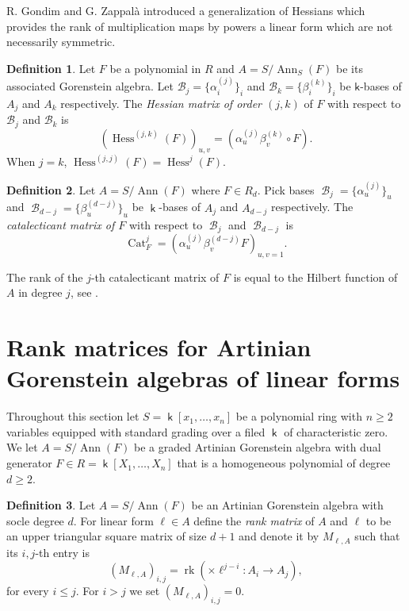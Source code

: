\documentclass[12pt]{amsart}
\numberwithin{equation}{section}
\theoremstyle{plain} \newtheorem{theorem}{Theorem}[section]
\theoremstyle{definition} \newtheorem{definition}[theorem]{Definition}
\DeclareMathOperator{\Hess}{Hess}\DeclareMathOperator{\rk}{rk}
\DeclareMathOperator{\ann}{Ann}\DeclareMathOperator{\Char}{char}
\DeclareMathOperator{\Cat}{Cat}\DeclareMathOperator{\B}{\mathcal{B}}
\DeclareMathOperator{\K}{\mathsf{k}}
\begin{document}
R. Gondim and G. Zappal\`a \cite{GZ} introduced a generalization of Hessians which provides the rank of multiplication maps by powers a linear form which are not necessarily symmetric.
\begin{definition}\cite[Definition 2.1]{GZ}
Let $F$ be a polynomial in $R$ and $A= S/\ann_S(F)$ be its associated Gorenstein algebra. Let $\mathcal{B}_{j} = \lbrace \alpha^{(j)}_i\rbrace_i$ and $\mathcal{B}_{k} = \lbrace \beta^{(k)}_i\rbrace_i$ be $\mathsf{k}$-bases of $A_j$ and $A_k$ respectively. The \emph{Hessian matrix of order $(j,k)$} of $F$ with respect to $\mathcal{B}_j$  and $\mathcal{B}_k$ is 
$$
(\Hess^{(j,k)}(F))_{u,v}=(\alpha^{(j)}_u\beta^{(k)}_v \circ F).
$$
When $j=k$, $\Hess^{(j,j)}(F)=\Hess^{j}(F)$. 
\end{definition}
\begin{definition}
 Let $A= S/\ann(F)$ where $F\in R_d$. Pick bases $\B_j = \lbrace \alpha^{(j)}_u\rbrace_u$ and $\B_{d-j} = \lbrace \beta^{(d-j)}_u\rbrace_u$ be $\K$-bases of $A_j$ and $A_{d-j}$ respectively. The \emph{catalecticant matrix of $F$} with respect to $\B_j$ and $\B_{d-j}$ is 
$$
\Cat^j_F=(\alpha^{(j)}_u\beta^{(d-j)}_v F)_{u,v=1}.
$$
\end{definition}
The rank of the $j$-th catalecticant matrix of $F$ is equal to the Hilbert function of $A$ in degree $j$, see \cite[Definition 1.11]{IK}.

\section{Rank matrices for Artinian    Gorenstein algebras of linear forms}\label{section-rksec}
Throughout this section let $S=\K[x_1,\dots, x_n]$ be a polynomial ring with $n\geq 2$ variables equipped with standard grading over a filed  $\K$ of characteristic zero. We let $A=S/\ann(F)$ be a graded Artinian Gorenstein algebra with dual generator $F\in R=\K[X_1,\dots , X_n ]$ that is a homogeneous polynomial of degree $d\geq 2$.
\begin{definition}\label{rkmatrix-def}
Let $A=S/\ann(F)$ be an Artinian    Gorenstein algebra with socle degree $d$. For linear form $\ell\in A$ define the \textit{rank matrix} of $A$ and $\ell$ to be  an upper triangular square matrix of size  $d+1$ and denote it by $M_{\ell,A}$ such that its $i,j$-th entry is 
$$(M_{\ell,A})_{i,j} = \rk\left(\times \ell^{j-i} : A_i\longrightarrow A_j\right),$$
for every $i\leq j$. For $i>j$ we set $ (M_{\ell,A})_{i,j}=0$.
\end{definition}
\end{document}
